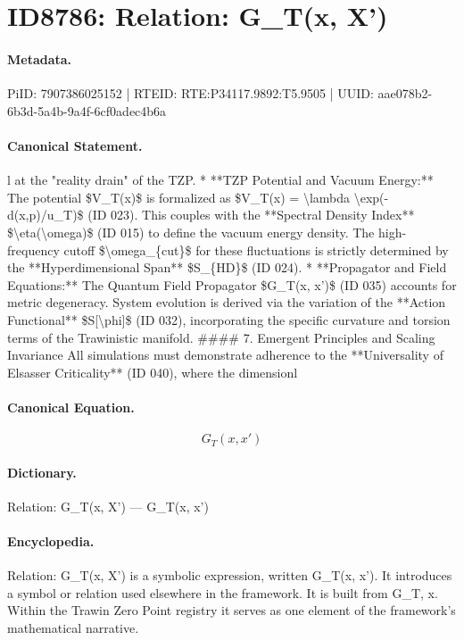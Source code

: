 \section*{ID8786: Relation: G\_T(x, X')}
\paragraph{Metadata.}
PiID: 7907386025152 | RTEID: RTE:P34117.9892:T5.9505 | UUID: aae078b2-6b3d-5a4b-9a4f-6cf0adec4b6a

\paragraph{Canonical Statement.}
l at the "reality drain" of the TZP. * **TZP Potential and Vacuum Energy:** The potential \$V\_T(x)\$ is formalized as \$V\_T(x) = \textbackslash{}lambda \textbackslash{}exp(-d(x,p)/u\_T)\$ (ID 023). This couples with the **Spectral Density Index** \$\textbackslash{}eta(\textbackslash{}omega)\$ (ID 015) to define the vacuum energy density. The high-frequency cutoff \$\textbackslash{}omega\_\{cut\}\$ for these fluctuations is strictly determined by the **Hyperdimensional Span** \$S\_\{HD\}\$ (ID 024). * **Propagator and Field Equations:** The Quantum Field Propagator \$G\_T(x, x')\$ (ID 035) accounts for metric degeneracy. System evolution is derived via the variation of the **Action Functional** \$S[\textbackslash{}phi]\$ (ID 032), incorporating the specific curvature and torsion terms of the Trawinistic manifold. \#\#\#\# 7. Emergent Principles and Scaling Invariance All simulations must demonstrate adherence to the **Universality of Elsasser Criticality** (ID 040), where the dimensionl

\paragraph{Canonical Equation.}
\[
G_T(x, x')
\]

\paragraph{Dictionary.}
Relation: G\_T(x, X') — G\_T(x, x')

\paragraph{Encyclopedia.}
Relation: G\_T(x, X') is a symbolic expression, written G\_T(x, x'). It introduces a symbol or relation used elsewhere in the framework. It is built from G\_T, x. Within the Trawin Zero Point registry it serves as one element of the framework's mathematical narrative.
